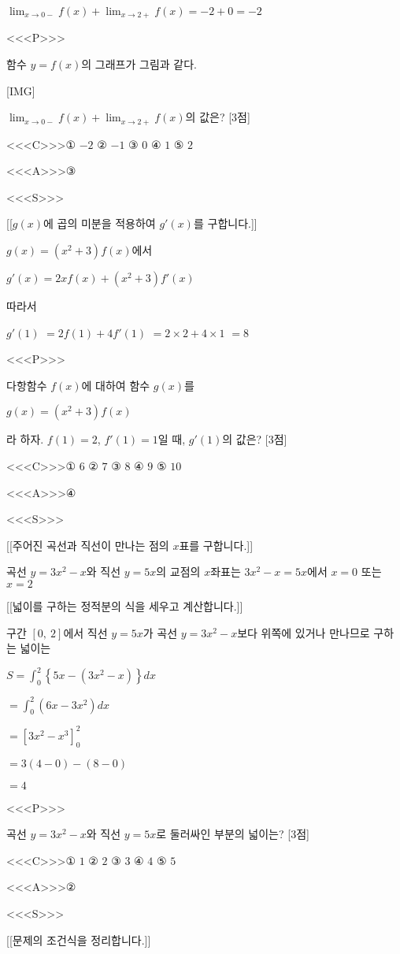 \documentclass{oblivoir}
\begin{document}
$\displaystyle\lim_{x\to 0-}f(x)+\displaystyle\lim_{x\to 2+}f(x)= -2+0= -2$

<<<P>>>

함수 $y=f(x)$의 그래프가 그림과 같다.

[IMG]

$\displaystyle\lim_{x\to 0-}f(x)+\displaystyle\lim_{x\to 2+}f(x)$의 값은? [3점]

<<<C>>>① $-2$ ② $-1$ ③ $0$ ④ $1$ ⑤ $2$

<<<A>>>③

<<<S>>>

[[$g(x)$에 곱의 미분을 적용하여 $g'(x)$를 구합니다.]]

$g(x)=(x^{2}+3)f(x)$에서

$g'(x)= 2xf(x)+(x^{2}+3)f'(x)$

따라서

$g'(1)$ $=2f(1)+4f'(1)$ $= 2\times 2 + 4\times 1$ $=8$

<<<P>>>

다항함수 $f(x)$에 대하여 함수 $g(x)$를

$g(x)=(x^{2}+3)f(x)$

라 하자. $f(1)=2$, $f'(1)=1$일 때, $g'(1)$의 값은? [3점]

<<<C>>>① $6$ ② $7$ ③ $8$ ④ $9$ ⑤ $10$

<<<A>>>④

<<<S>>>

[[주어진 곡선과 직선이 만나는 점의 $x$표를 구합니다.]]

곡선 $y=3x^{2}-x$와 직선 $y=5x$의 교점의 $x$좌표는 $3x^{2}-x=5x$에서 $x=0$ 또는 $x=2$

[[넓이를 구하는 정적분의 식을 세우고 계산합니다.]]

구간 $[0,\:2]$에서 직선 $y=5x$가 곡선 $y=3x^{2}-x$보다 위쪽에 있거나 만나므로 구하는 넓이는

$S=\displaystyle\int_{0}^{2}\left\{5x-(3x^{2}-x)\right\}dx$

$=\displaystyle\int_{0}^{2}(6x-3x^{2})dx$

$=\left[3x^{2}-x^{3}\right]_{0}^{2}$

$=3(4-0)-(8-0)$

$=4$

<<<P>>>

곡선 $y=3x^{2}-x$와 직선 $y=5x$로 둘러싸인 부분의 넓이는? [3점]

<<<C>>>① $1$ ② $2$ ③ $3$ ④ $4$ ⑤ $5$

<<<A>>>②

<<<S>>>

[[문제의 조건식을 정리합니다.]]
\end{document}
